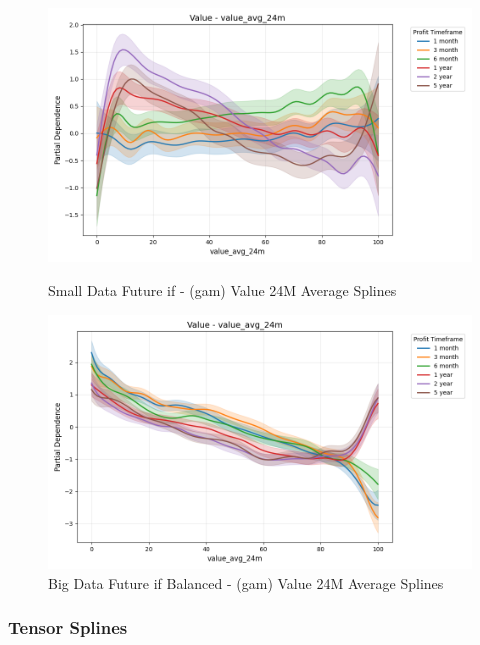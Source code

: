 \documentclass[11pt,english,a4paper,hidelinks]{book}
\begin{document}
\begin{figure}[H]
    \centering
    \begin{minipage}{0.48\textwidth}
        \centering
        \includegraphics[width=\textwidth]{images/code/models/general_regression/splines/2D/Small Data future - IF/value_value_avg_24m.png}
        \caption{Small Data Future \acrshort{if} - (\acrshort{gam}) Value 24M Average Splines}
        \label{fig:spline_value_value_avg_24m}
    \end{minipage}\hfill
    \begin{minipage}{0.48\textwidth}
        \centering
        \includegraphics[width=\textwidth]{images/code/models/general_regression/splines/2D/Big Data future - IF HARD Balanced/value_value_avg_24m.png}
        \caption{Big Data Future \acrshort{if} Balanced - (\acrshort{gam}) Value 24M Average Splines}
        \label{fig:spline_value_value_avg_24m_balanced}
    \end{minipage}
\end{figure}

\subsubsection{Tensor Splines}
\end{document}
